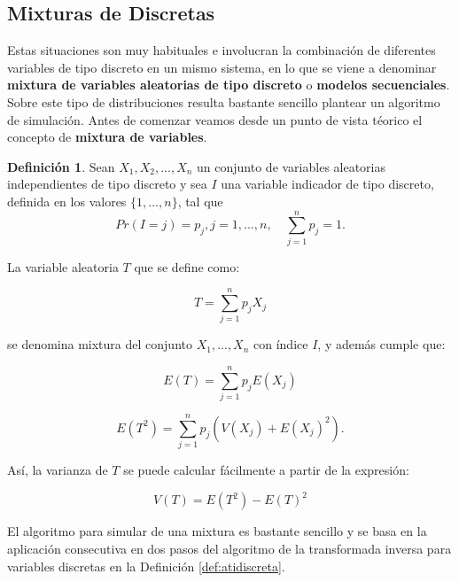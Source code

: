 \documentclass[
]{book}
\newenvironment{yellowbox}{
  \definecolor{shadecolor}{rgb}{210, 180, 140}  
  \color{black}
  \begin{shaded}}
 {\end{shaded}}
\theoremstyle{definition}
\newtheorem{definition}{Definición}[chapter]
\theoremstyle{definition}
\theoremstyle{definition}
\theoremstyle{definition}
\theoremstyle{remark}
\begin{document}
\hypertarget{mixturas-de-discretas}{%
\subsection{Mixturas de Discretas}\label{mixturas-de-discretas}}

Estas situaciones son muy habituales e involucran la combinación de diferentes variables de tipo discreto en un mismo sistema, en lo que se viene a denominar \textbf{mixtura de variables aleatorias de tipo discreto} o \textbf{modelos secuenciales}. Sobre este tipo de distribuciones resulta bastante sencillo plantear un algoritmo de simulación. Antes de comenzar veamos desde un punto de vista téorico el concepto de \textbf{mixtura de variables}.

\begin{yellowbox}

\begin{definition}
\protect\hypertarget{def:mixturadiscreta}{}\label{def:mixturadiscreta}Sean \(X_1, X_2,...,X_n\) un conjunto de variables aleatorias independientes de tipo discreto y sea \(I\) una variable indicador de tipo discreto, definida en los valores \(\{1,..., n\}\), tal que \[Pr(I=j)=p_j, j=1,..., n, \quad \sum_{j=1}^n p_j = 1.\]

La variable aleatoria \(T\) que se define como:

\[ T = \sum_{j =1}^n p_j X_j\]

se denomina mixtura del conjunto \(X_1,...,X_n\) con índice \(I\), y además cumple que:

\[E(T) = \sum_{j=1}^n p_j E(X_j)\]

\[E(T^2) = \sum_{j=1}^n p_j (V(X_j) + E(X_j)^2).\]

Así, la varianza de \(T\) se puede calcular fácilmente a partir de la expresión:

\[V(T) = E(T^2) - E(T)^2\]
\end{definition}

\end{yellowbox}

El algoritmo para simular de una mixtura es bastante sencillo y se basa en la aplicación consecutiva en dos pasos del algoritmo de la transformada inversa para variables discretas en la Definición \ref{def:atidiscreta}.
\end{document}
